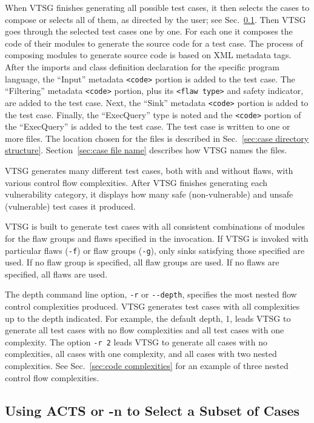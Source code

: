 When VTSG finishes generating all possible test cases, it then selects the cases
to compose or selects all of them, as directed by the user;
see Sec.~\ref{sec:selecting cases}.
Then VTSG goes through the selected test cases one by one.  For each one it
composes the code of their modules to generate the source code for a test case.
The process of composing modules to generate source code is
based on XML metadata tags.
After the imports and class definition declaration for the 
specific program
language, the ``Input'' metadata \verb|<code>| portion
is added to the test case.  
The ``Filtering'' metadata \verb|<code>| portion, plus its
\verb|<flaw type>| and safety indicator, are added to
the test case.  Next, the ``Sink'' metadata 
\verb|<code>| portion
is added to the test case.  Finally, the ``ExecQuery'' type is 
noted and the 
\verb|<code>| portion of the ``ExecQuery'' is added
to the 
test case.  The test case is written to one or more files.
The location chosen for the files is
described in Sec.~\ref{sec:case directory structure}.
Section~\ref{sec:case file name} describes how VTSG names the files.

VTSG generates many different test cases, both with and without
flaws, with various control flow complexities.  After VTSG finishes
generating each vulnerability category, it displays how many safe (non-vulnerable)
and unsafe (vulnerable) test cases it produced.

VTSG is built to generate test cases with all consistent combinations
of modules for the flaw groups and flaws specified in the invocation.
If VTSG is invoked with particular flaws (\verb|-f|) or flaw groups (\verb|-g|),
only sinks satisfying those specified are used.
If no flaw group is specified, all flaw groups are used.  
If no flaws are specified, all flaws are used.

\label{sec:depth of complexities}
The depth command line option, \verb|-r| or \verb|--depth|, 
specifies the
most nested flow control complexities produced.
VTSG generates test cases with all complexities up to the depth
indicated.
For example, the default depth, 1, leads VTSG to generate all
test cases with no flow complexities and all test cases with 
one complexity.  The option \verb|-r 2| leads VTSG to generate
all cases with no complexities, all cases with one complexity, 
and all cases with two nested complexities.
See Sec.~\ref{sec:code complexities} for an example of three 
nested control flow complexities.

\subsection{Using ACTS or -n to Select a Subset of Cases}
\label{sec:selecting cases}

